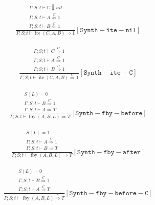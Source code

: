 \documentclass{scrartcl}
\DeclareMathOperator{\fby}{fby}
\DeclareMathOperator{\ite}{ite}
\begin{document}
    \begin{align*}
    \frac{
        \begin{matrix}
        \Gamma; S; t \vdash C \Downarrow nil \\
        \Gamma; S; t \vdash A \overset{C}{\Leftarrow} 1 \\
        \Gamma; S; t \vdash B \overset{C}{\Leftarrow} 1
        \end{matrix}
    }{
        \Gamma; S; t \vdash \ite(C,A,B) \Rightarrow 1
    }[\mathtt{Synth-ite-nil}]
    \end{align*}
    
    \begin{align*}
    \frac{
        \begin{matrix}
        \Gamma; S; t \vdash C \overset{C}{\Rightarrow} 1 \\
        \Gamma; S; t \vdash A \overset{C}{\Rightarrow} 1 \\
        \Gamma; S; t \vdash B \overset{C}{\Rightarrow} 1
        \end{matrix}
    }{
        \Gamma; S; t \vdash \ite(C,A,B) \overset{C}{\Rightarrow} 1
    }[\mathtt{Synth-ite-C}]
    \end{align*}
    
    \begin{align*}
    \frac{
        \begin{matrix}
        S(L) = 0 \\
        \Gamma; S; t \vdash B \overset{C}{\Rightarrow} 1 \\
        \Gamma; S; t \vdash A \Rightarrow T
        \end{matrix}
    }{
        \Gamma; S; t \vdash \fby(A, B, L) \Rightarrow T
    }[\mathtt{Synth-fby-before}]
    \end{align*}
    
    \begin{align*}
    \frac{
        \begin{matrix}
        S(L) = 1 \\
        \Gamma; S; t \vdash A \overset{C}{\Rightarrow} 1 \\
        \Gamma; S; t \vdash B \Rightarrow T
        \end{matrix}
    }{
        \Gamma; S; t \vdash \fby(A, B, L) \Rightarrow T
    }[\mathtt{Synth-fby-after}]
    \end{align*}
    
    \begin{align*}
    \frac{
        \begin{matrix}
        S(L) = 0 \\
        \Gamma; S; t \vdash B \overset{C}{\Rightarrow} 1 \\
        \Gamma; S; t \vdash A \overset{C}{\Rightarrow} T
        \end{matrix}
    }{
        \Gamma; S; t \vdash \fby(A, B, L) \overset{C}{\Rightarrow} T
    }[\mathtt{Synth-fby-before-C}]
    \end{align*}
    
\end{document}
